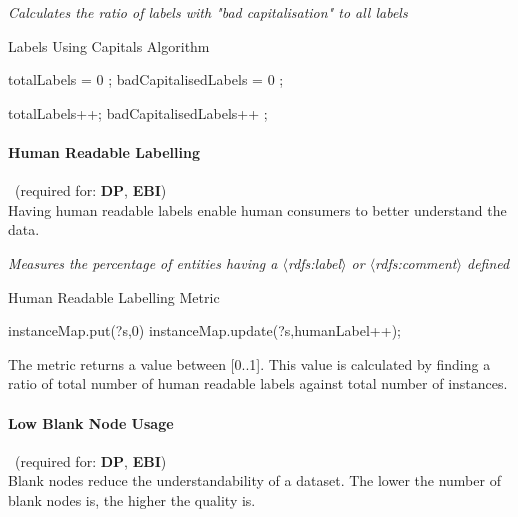\begin{mdframed}[style=metricdefinition]
\emph{Calculates the ratio of labels with "bad capitalisation" to all labels}
\end{mdframed}

\begin{algorithm}
\caption{Labels Using Capitals Algorithm}\label{lst:badCapitals}
\begin{algorithmic}[1]
\State totalLabels = 0 ;
\State badCapitalisedLabels = 0 ;
\EndProcedure

 totalLabels++; \EndIf
{}badCapitalisedLabels++ ; \EndIf
{}
\EndProcedure
\end{algorithmic}
\end{algorithm}

\paragraph{Human Readable Labelling}~(required for: \textbf{DP}, \textbf{EBI})~\\
Having human readable labels enable human consumers to better understand the data.

\begin{mdframed}[style=metricdefinition]
\emph{Measures the percentage of entities having a $\langle$rdfs:label$\rangle$ or $\langle$rdfs:comment$\rangle$ defined}
\end{mdframed}

\begin{algorithm}
\caption{Human Readable Labelling Metric}
\begin{algorithmic}[1]
 instanceMap.put(?s,0)
 instanceMap.update(?s,humanLabel++);   \EndIf 
\EndProcedure
\end{algorithmic}
\end{algorithm}

The metric returns a value between [0..1]. This value is calculated by finding a ratio of total number of human readable labels against total number of instances.

\paragraph{Low Blank Node Usage}~(required for: \textbf{DP}, \textbf{EBI})~\\
Blank nodes reduce the understandability of a dataset.
The lower the number of blank nodes is, the higher the quality is.

